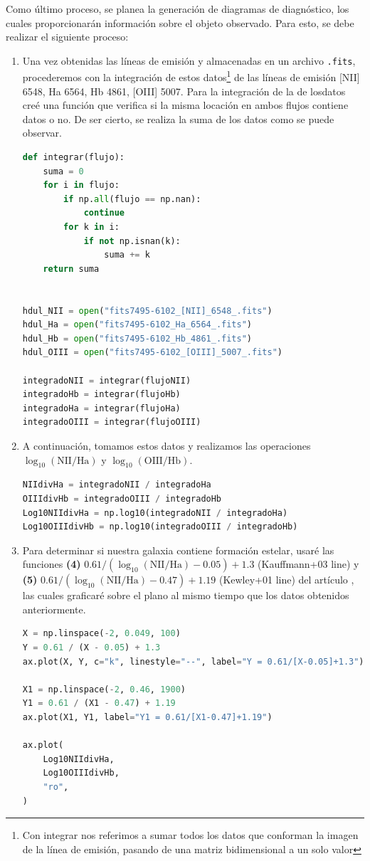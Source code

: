 \documentclass[10pt,twocolumn,a4paper]{opticajnl}
\begin{document}
Como último proceso, se planea la generación de diagramas de diagnóstico, los cuales proporcionarán información sobre el objeto observado. Para esto, se debe realizar el siguiente proceso:
\begin{enumerate}
  \item Una vez obtenidas las líneas de emisión y almacenadas en un archivo \texttt{.fits}, procederemos con la integración de estos datos\footnote{Con integrar nos referimos a sumar todos los datos que conforman la imagen de la línea de emisión, pasando de una matriz bidimensional a un solo valor} de las líneas de emisión [NII] 6548, Ha 6564, Hb 4861, [OIII] 5007. Para la integración de la de losdatos creé una función que verifica si la misma locación en ambos flujos contiene datos o no. De ser cierto, se realiza la suma de los datos como se puede observar.
    \begin{lstlisting}[language=Python]
def integrar(flujo):
    suma = 0
    for i in flujo:
        if np.all(flujo == np.nan):
            continue
        for k in i:
            if not np.isnan(k):
                suma += k
    return suma


hdul_NII = open("fits7495-6102_[NII]_6548_.fits")
hdul_Ha = open("fits7495-6102_Ha_6564_.fits")
hdul_Hb = open("fits7495-6102_Hb_4861_.fits")
hdul_OIII = open("fits7495-6102_[OIII]_5007_.fits")

integradoNII = integrar(flujoNII)
integradoHb = integrar(flujoHb)
integradoHa = integrar(flujoHa)
integradoOIII = integrar(flujoOIII)
    \end{lstlisting}
    
  \item A continuación, tomamos estos datos y realizamos las operaciones \(\log_{10}(\text{NII}/\text{Ha})\) y \(\log_{10}(\text{OIII}/\text{Hb})\).
    \begin{lstlisting}[language=Python]
NIIdivHa = integradoNII / integradoHa
OIIIdivHb = integradoOIII / integradoHb
Log10NIIdivHa = np.log10(integradoNII / integradoHa)
Log10OIIIdivHb = np.log10(integradoOIII / integradoHb)
    \end{lstlisting}
  \item Para determinar si nuestra galaxia contiene formación estelar, usaré las funciones \textbf{(4)} \(0.61 / (\log_{10}(\text{NII}/\text{Ha}) - 0.05) + 1.3\) (Kauffmann+03 line) y \textbf{(5)} \(0.61 / (\log_{10}(\text{NII}/\text{Ha}) - 0.47) + 1.19\) (Kewley+01 line) del artículo \cite{2006MNRAS.372..961K}, las cuales graficaré sobre el plano al mismo tiempo que los datos obtenidos anteriormente.
    \begin{lstlisting}[language=Python]
X = np.linspace(-2, 0.049, 100)
Y = 0.61 / (X - 0.05) + 1.3
ax.plot(X, Y, c="k", linestyle="--", label="Y = 0.61/[X-0.05]+1.3")

X1 = np.linspace(-2, 0.46, 1900)
Y1 = 0.61 / (X1 - 0.47) + 1.19
ax.plot(X1, Y1, label="Y1 = 0.61/[X1-0.47]+1.19")

ax.plot(
    Log10NIIdivHa,
    Log10OIIIdivHb,
    "ro",
)
    \end{lstlisting}
\end{enumerate} 
\end{document}
